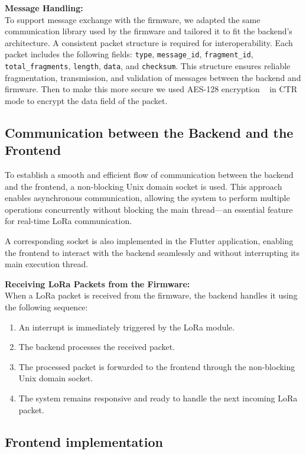 \textbf{Message Handling:} \\
To support message exchange with the firmware, 
we adapted the same communication library used by the firmware and tailored it to fit the backend's architecture. 
A consistent packet structure is required for interoperability. Each packet includes the following fields: 
\texttt{type}, \texttt{message\_id}, \texttt{fragment\_id}, \texttt{total\_fragments}, \texttt{length}, \texttt{data}, and \texttt{checksum}. 
This structure ensures reliable fragmentation, transmission, and validation of messages between the backend and firmware.
Then to make this more secure we used AES-128 encryption ~\cite{tiny-AES} in CTR mode to encrypt the data field of the packet. 

\subsection{Communication between the Backend and the Frontend}

To establish a smooth and efficient flow of communication between the backend and the frontend, a non-blocking Unix domain socket is used.
This approach enables asynchronous communication, allowing the system to perform multiple operations concurrently without blocking the main 
thread—an essential feature for real-time LoRa communication.

A corresponding socket is also implemented in the Flutter application, enabling the frontend to interact with the backend seamlessly 
and without interrupting its main execution thread.

\textbf{Receiving LoRa Packets from the Firmware:} \\
When a LoRa packet is received from the firmware, the backend handles it using the following sequence:

\begin{enumerate}
  \item An interrupt is immediately triggered by the LoRa module.
  \item The backend processes the received packet.
  \item The processed packet is forwarded to the frontend through the non-blocking Unix domain socket.
  \item The system remains responsive and ready to handle the next incoming LoRa packet.
\end{enumerate}

\subsection{Frontend implementation}

